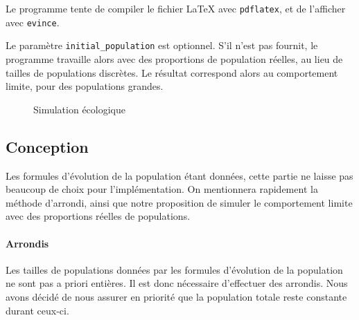 \documentclass[draft,10pt]{article}
\begin{document}
Le programme tente de compiler le fichier \LaTeX{} avec \verb|pdflatex|, et de l'afficher avec \verb|evince|.

Le paramètre \verb|initial_population| est optionnel. S'il n'est pas fournit, le programme travaille
alors avec des proportions de population réelles, au lieu de tailles de populations discrètes.
Le résultat correspond alors au comportement limite, pour des populations grandes.

\begin{figure}
\caption{Simulation écologique}
\label{sim_plot}
\begin{center}
\end{center}
\end{figure}

\subsection{Conception}
Les formules d'évolution de la population étant données, cette partie ne laisse pas beaucoup de choix pour l'implémentation.
On mentionnera rapidement la méthode d'arrondi, ainsi que notre proposition de simuler le comportement limite avec
des proportions réelles de populations.

\paragraph{Arrondis}
Les tailles de populations données par les formules d'évolution de la population ne sont pas a priori entières.
Il est donc nécessaire d'effectuer des arrondis.
Nous avons décidé de nous assurer en priorité que la population totale reste constante durant ceux-ci.
\end{document}
